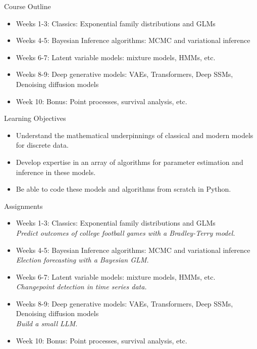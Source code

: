 \documentclass[aspectratio=169]{beamer}
\begin{document}
\begin{frame}{Course Outline}

\begin{itemize}
  \item Weeks 1-3: Classics: Exponential family distributions and GLMs
  \item Weeks 4-5: Bayesian Inference algorithms: MCMC and variational inference
  \item Weeks 6-7: Latent variable models: mixture models, HMMs, etc.
  \item Weeks 8-9: Deep generative models: VAEs, Transformers, Deep SSMs, Denoising diffusion models
  \item Week 10: Bonus: Point processes, survival analysis, etc.
\end{itemize}

\end{frame}


\begin{frame}{Learning Objectives}
  \begin{itemize}
    \item Understand the mathematical underpinnings of classical and modern models for discrete data.
    
    \item Develop expertise in an array of algorithms for parameter estimation and inference in these models.
    
    \item Be able to code these models and algorithms from scratch in Python.
  \end{itemize}
\end{frame}

\begin{frame}{Assignments}

  \begin{itemize}
    \item Weeks 1-3: Classics: Exponential family distributions and GLMs \\
    \qquad \textit{Predict outcomes of college football games with a Bradley-Terry model.}

    \item Weeks 4-5: Bayesian Inference algorithms: MCMC and variational inference \\
    \qquad \textit{Election forecasting with a Bayesian GLM.}

    \item Weeks 6-7: Latent variable models: mixture models, HMMs, etc. \\
    \qquad \textit{Changepoint detection in time series data.}

    \item Weeks 8-9: Deep generative models: VAEs, Transformers, Deep SSMs, Denoising diffusion models \\
    \qquad \textit{Build a small LLM.}

    \item Week 10: Bonus: Point processes, survival analysis, etc.
  \end{itemize}
  
\end{frame}
    
\end{document}
